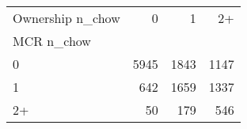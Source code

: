 \begin{tabular}{lrrr}
\toprule
Ownership n_chow & 0 & 1 & 2+ \\
MCR n_chow &  &  &  \\
\midrule
0 & 5945 & 1843 & 1147 \\
1 & 642 & 1659 & 1337 \\
2+ & 50 & 179 & 546 \\
\bottomrule
\end{tabular}
